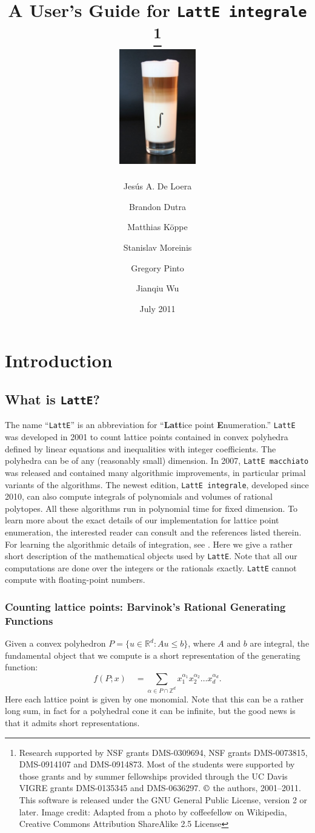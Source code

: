 \documentclass{article}
\title{A User's Guide for {\tt LattE integrale} \latteV 
\footnote{Research supported by NSF grants DMS-0309694, NSF grants
DMS-0073815, DMS-0914107 and DMS-0914873.
Most of the students were supported by those
grants and by summer fellowships provided through the UC Davis VIGRE grants
DMS-0135345 and DMS-0636297. $\copyright$ 
the authors, 2001--2011. This
software is released under the GNU General Public License, version 2 or later.
Image credit: Adapted from a photo by coffeefellow on Wikipedia, Creative Commons Attribution ShareAlike 2.5 License}
\\[4ex] \includegraphics[width=0.25\textwidth]{latte-integrale.jpg}
}%
\author{Jes\'us A. De Loera \and
Brandon Dutra \and
Matthias K\"oppe \and 
Stanislav Moreinis \and
Gregory Pinto \and
Jianqiu Wu \and
}
\date{July 2011}
\newcommand{\Z}{{\mathbb Z}}
\newcommand{\R}{{\mathbb R}}
\newcommand{\latte}{{\tt LattE}\xspace}
\begin{document}
\maketitle{}

\newpage

\tableofcontents

\newpage

\section{Introduction}

\subsection{What is {\tt LattE}?} \label{intro}

The name ``{\tt LattE}'' is an abbreviation for ``{\bf Latt}ice point 
{\bf E}numeration.'' \latte was developed in 2001 to count lattice points contained in 
convex polyhedra defined by linear equations and inequalities with 
integer coefficients. The polyhedra can be of any (reasonably small) 
dimension. In 2007, {\tt LattE macchiato} was released and contained many 
algorithmic improvements, in particular primal variants of the algorithms. 
The newest edition, {\tt LattE integrale}, developed
since 2010, can also compute integrals of polynomials and volumes of rational polytopes. 
All these algorithms run in polynomial
time for fixed dimension. To
learn more about the exact details of our implementation for lattice point enumeration, the interested reader can consult 
\cite{koeppe:irrational-barvinok, latte1} and the references listed therein. 
For learning the algorithmic details of integration, see \cite{howToIntegratePolynomialSimplex, latte-integrale-paper}. Here we
give a rather short description of the mathematical objects used by
{\tt LattE}. Note that all our computations are done over the integers or the rationals {\emph exactly}.
\latte cannot compute with floating-point numbers. 

\subsubsection{Counting lattice points: Barvinok's Rational Generating Functions}

Given a convex polyhedron $P = \{u\in\R^d:Au\leq b\}$, where $A$ and
$b$ are integral, the fundamental object that we compute is a short 
representation of the generating function:
\[
f(P;x) \quad = \sum_{\alpha\in P\cap\Z^d} x_1^{\alpha_1}
x_2^{\alpha_2} \ldots x_d^{\alpha_d}.
\]
Here each lattice point is given by one monomial. Note that this can be 
a rather long sum, in fact for a polyhedral cone it can be infinite, but 
the good news is that it admits short representations.
\end{document}
